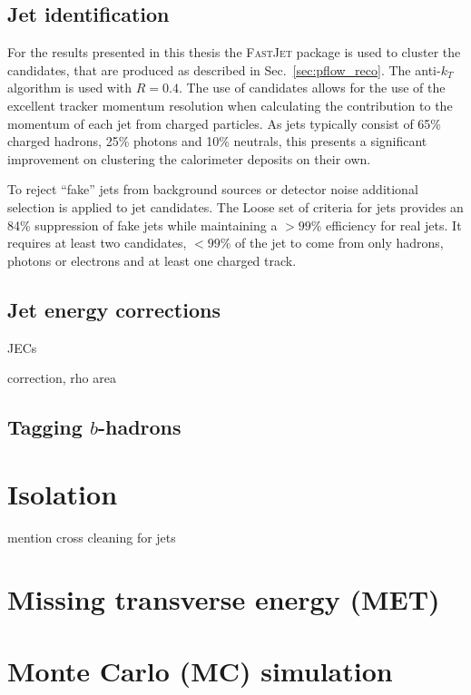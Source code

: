 \subsection{Jet identification}

For the results presented in this thesis the \textsc{FastJet}
\cite{Cacciari2012} package is used to cluster the \PF candidates,
that are produced as described in Sec.~\ref{sec:pflow_reco}. The
anti-$k_T$ algorithm is used with $R=0.4$. The use of \PF candidates
allows for the use of the excellent tracker momentum resolution when
calculating the contribution to the momentum of each jet from charged
particles. As jets typically consist of 65\% charged hadrons, 25\%
photons and 10\% neutrals, this presents a significant improvement on
clustering the calorimeter deposits on their own. 

To reject ``fake'' jets from background sources or detector noise
additional selection is applied to jet candidates. The Loose set of
criteria for jets provides an 84\% suppression of fake jets while
maintaining a $>99\%$ efficiency for real jets. It requires at least
two \PF candidates, $<99\%$ of the jet to come from only hadrons,
photons or electrons and at least one charged track.

\subsection{Jet energy corrections}

JECs

\PU correction, rho area

\subsection{Tagging $b$-hadrons}

\section{Isolation}

mention cross cleaning for jets

\section{Missing transverse energy (MET)}
\label{sec:met_reco}

\section{Monte Carlo (MC) simulation}
\label{sec:mc_reco}

